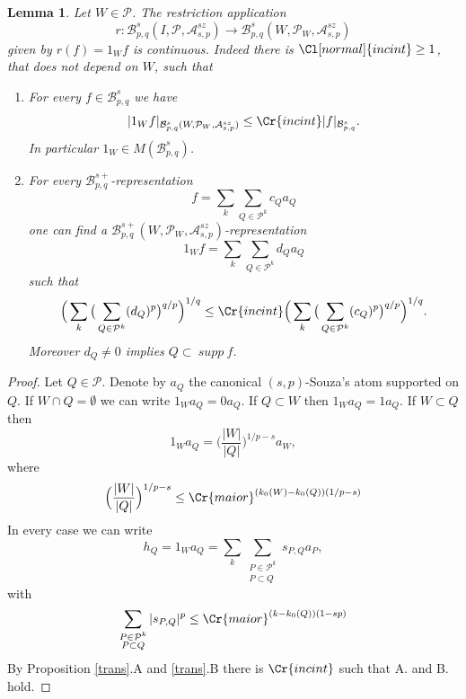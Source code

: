 \documentclass{amsart}
\newtheorem{lemma}[theorem]{Lemma}
\theoremstyle{definition}
\newcommand{\Cll}[2][normal]{\Cl[#1]{#2}}
\newcommand{\Crr}[1]{\Cr{#1}}
\begin{document}
\begin{lemma}\label{incint3} Let $W\in \mathcal{P}$. The restriction application
$$r\colon \mathcal{B}^s_{p,q}(I, \mathcal{P}, \mathcal{A}^{sz}_{s,p})\rightarrow  \mathcal{B}^s_{p,q}(W, \mathcal{P}_W, \mathcal{A}^{sz}_{s,p})$$
given by $r(f)=1_Wf$ is continuous. Indeed there is $\Cll{incint} \geq 1$, that does not depend on $W$, such that 
\begin{enumerate}
\item[A.] For every $f \in \mathcal{B}^s_{p,q}$ we have 
\begin{equation}\label{incint2} |1_Wf|_{\mathcal{B}^s_{p,q}(W, \mathcal{P}_W, \mathcal{A}^{sz}_{s,p})}\leq \Crr{incint} |f|_{\mathcal{B}^s_{p,q}}. \end{equation}
In particular $1_W\in M(\mathcal{B}^s_{p,q})$.
\item[B.] For every  $\mathcal{B}^{s+}_{p,q}$-representation 
$$f=\sum_{k}\sum_{Q\in \mathcal{P}^k} c_Qa_Q$$
 one can find a $\mathcal{B}^{s+}_{p,q}(W, \mathcal{P}_W, \mathcal{A}^{sz}_{s,p})$-representation 
$$1_Wf= \sum_{k}\sum_{Q\in \mathcal{P}^k} d_Qa_Q$$
such that 
\begin{equation}\label{incint2b}
\Big( \sum_k \big(\sum_{Q\in \mathcal{P}^k}  (d_Q)^p\big)^{q/p} \Big)^{1/q} \leq \Crr{incint} \Big( \sum_k \big(\sum_{Q\in \mathcal{P}^k}  (c_Q)^p\big)^{q/p} \Big)^{1/q} . 
\end{equation} 
Moreover  $d_Q\neq 0$ implies $Q\subset \ supp \ f$.
\end{enumerate}
\end{lemma} 
\begin{proof} Let $Q\in \mathcal{P}.$ Denote by $a_Q$ the canonical $(s,p)$-Souza's atom supported on $Q$.  If $W\cap Q=\emptyset$ we can write $1_Wa_Q= 0a_Q.$ If $Q\subset W$ then $1_Wa_Q= 1a_Q.$ If $W\subset Q$ then
$$1_Wa_Q= \Big(\frac{|W|}{|Q|}\Big)^{1/p-s}a_W,$$
where
$$ \Big(\frac{|W|}{|Q|}\Big)^{1/p-s}\leq \Crr{maior}^{(k_0(W)-k_0(Q))(1/p-s)}$$
In every case we can write
$$h_Q=1_Wa_Q = \sum_k \sum_{\substack{P\in \mathcal{P}^k\\ P\subset Q}}    s_{P,Q} a_P,$$
with 
$$ \sum_{\substack{P\in \mathcal{P}^k\\ P\subset Q}}    |s_{P,Q}| ^p\leq \Crr{maior}^{(k-k_0(Q))(1-sp)}$$
By Proposition \ref{trans}.A and \ref{trans}.B  there is $\Crr{incint}$ such that  A. and  B.  hold. 
\end{proof}
\end{document}
